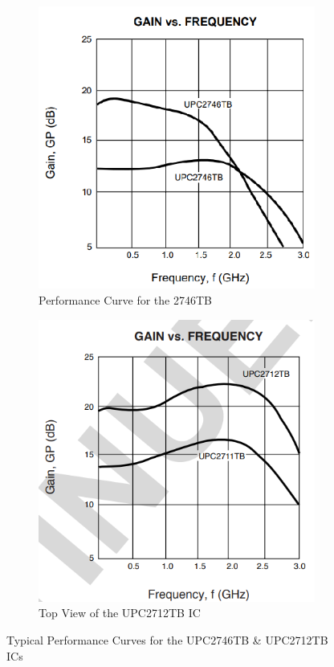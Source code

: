 \begin{figure}[H]
	\setlength{\unitlength}{\textwidth} 
	\centering
	\begin{subfigure}{.5\textwidth}
  		\centering
  		\includegraphics[width=0.3\unitlength]{2746_perf}
  		\caption{\label{fig:2746top}Performance Curve for the 2746TB }
	\end{subfigure}%
	\begin{subfigure}{.5\textwidth}
  		\centering
		\includegraphics[width=0.3\unitlength]{2712_perf}
  		\caption{\label{fig:2712top}Top View of the UPC2712TB IC}
	\end{subfigure}
\caption{\label{fig:274612top} Typical Performance Curves for the UPC2746TB \& UPC2712TB ICs   }
\end{figure}	


